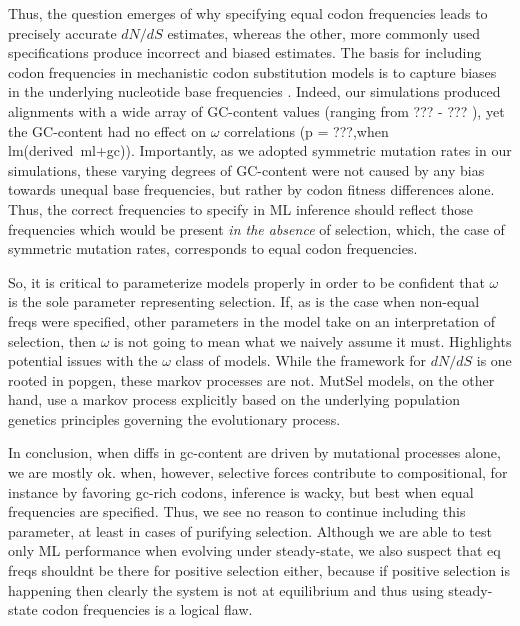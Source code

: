 \documentclass[11pt]{article}
\begin{document}

Thus, the question emerges of why specifying equal codon frequencies leads to precisely accurate $dN/dS$ estimates, whereas the other, more commonly used specifications produce incorrect and biased estimates. The basis for including codon frequencies in mechanistic codon substitution models is to capture biases in the underlying nucleotide base frequencies \cite{YN00, Yang2006}. Indeed, our simulations produced alignments with a wide array of GC-content values (ranging from ??? - ??? ), yet the GC-content had no effect on $\omega$ correlations (p = ???,when lm(derived~ml+gc)). Importantly, as we adopted symmetric mutation rates in our simulations, these varying degrees of GC-content were not caused by any bias towards unequal base frequencies, but rather by codon fitness differences alone. Thus, the correct frequencies to specify in ML inference should reflect those frequencies which would be present \textit{in the absence} of selection, which, the case of symmetric mutation rates, corresponds to equal codon frequencies.

So, it is critical to parameterize models properly in order to be confident that $\omega$ is the sole parameter representing selection. If, as is the case when non-equal freqs were specified, other parameters in the model take on an interpretation of selection, then $\omega$ is not going to mean what we naively assume it must.
Highlights potential issues with the $\omega$ class of models. While the framework for $dN/dS$ is one rooted in popgen, these markov processes are not. MutSel models, on the other hand, use a markov process explicitly based on the underlying population genetics principles governing the evolutionary process. 


In conclusion, when diffs in gc-content are driven by mutational processes alone, we are mostly ok. when, however, selective forces contribute to compositional, for instance by favoring gc-rich codons, inference is wacky, but best when equal frequencies are specified. Thus, we see no reason to continue including this parameter, at least in cases of purifying selection. Although we are able to test only ML performance when evolving under steady-state, we also suspect that eq freqs shouldnt be there for positive selection either, because if positive selection is happening then clearly the system is not at equilibrium and thus using steady-state codon frequencies is a logical flaw.
\end{document}
